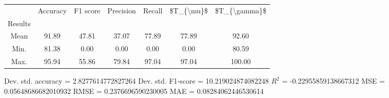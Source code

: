 \begin{tabular}{|c|c|c|c|c|c|c|}
\toprule
{} &  Accuracy &  F1 score &  Precision &  Recall &  \$T\_\{\textbackslash mu\}\$ &  \$T\_\{\textbackslash gamma\}\$ \\
Results &           &           &            &         &            &               \\
\hline
Mean    &     91.89 &     47.81 &      37.07 &   77.89 &      77.89 &         92.60 \\
Min.    &     81.38 &      0.00 &       0.00 &    0.00 &       0.00 &         80.59 \\
Max.    &     95.94 &     55.86 &      79.84 &   97.04 &      97.04 &        100.00 \\
\bottomrule
\end{tabular}

 Dev. std. accuracy = 2.8277614772827264
 Dev. std. F1-score = 10.219024874082248
 $R^2$ = -0.22955859138667312
 MSE = 0.05648686682010932
 RMSE = 0.2376696590230005
 MAE = 0.08284062446530614